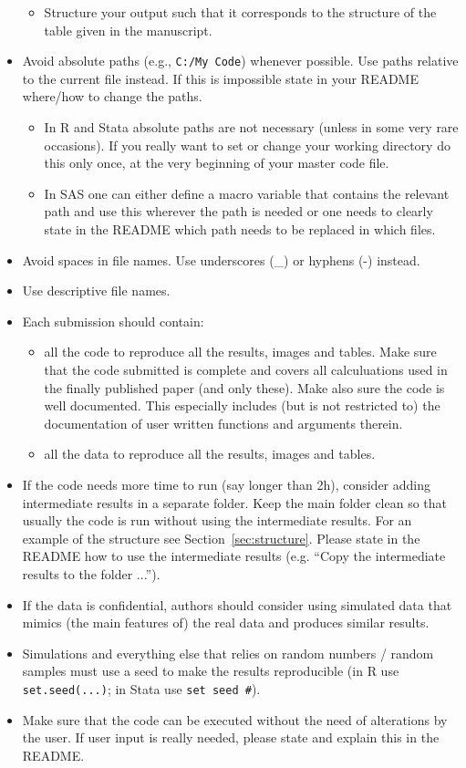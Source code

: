 \documentclass[12pt,a4paper]{article}
\begin{document}
\begin{itemize}
\begin{itemize}
  \item Structure your output such that it corresponds to the structure of the
    table given in the manuscript.
  \end{itemize}
\item Avoid absolute paths (e.g., \verb+C:/My Code+) whenever possible. Use
  paths relative to the current file instead. If this is impossible state in
  your README where/how to change the paths.
  \begin{itemize}
  \item In \textsf{R} and \textsf{Stata} absolute paths are not necessary
    (unless in some very rare occasions). If you really want to set or change
    your working directory do this only once, at the very beginning of your
    master code file.
  \item In \textsf{SAS} one can either define a macro variable that contains the
    relevant path and use this wherever the path is needed or one needs to
    clearly state in the README which path needs to be replaced in which files.
  \end{itemize}
\item Avoid spaces in file names. Use underscores (\_) or hyphens (-) instead.
\item Use descriptive file names.
\item Each submission {should} contain:
\begin{itemize}
\item all the code to reproduce all the results, images and tables. Make sure
  that the code submitted is complete and covers all calculuations used in the
  finally published paper (and only these). Make also sure the code is well
  documented. This especially includes (but is not restricted to) the
  documentation of user written functions and arguments therein.
\item all the data to reproduce all the results, images and tables.
\end{itemize}
\item If the code needs more time to run (say longer than 2h), consider adding
  intermediate results in a separate folder. Keep the main folder clean so that
  usually the code is run without using the intermediate results. For an example
  of the structure see Section~\ref{sec:structure}. Please state in the README
  how to use the intermediate results (e.g. ``Copy the intermediate results to
  the folder ...'').
\item If the data is confidential, authors should consider using simulated data
  that mimics (the main features of) the real data and produces similar results.
\item Simulations and everything else that relies on random numbers / random
  samples {must} use a seed to make the results reproducible (in \textsf{R} use
  \texttt{set.seed(...)}; in Stata use \texttt{set seed \#}).
\item Make sure that the code can be executed without the need of alterations by
  the user. If user input is really needed, please state and explain this in the
  README.
\end{itemize}
\end{document}
